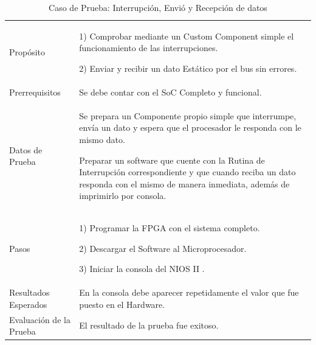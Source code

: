 \begin{table}
	\begin{tabular}{|>{\columncolor[gray]{0.8}}l|p{9cm}|} \hline
\multicolumn{2}{|>{\columncolor[gray]{0.8}}l|}{\textbf{Caso de Prueba: Interrupción, Envió y Recepción de datos}}\\ \hline
Propósito  & 1) Comprobar mediante un Custom Component simple el funcionamiento de las interrupciones.

2) Enviar y recibir un dato Estático por el bus sin errores. 
\\ \hline
 Prerrequisitos  & Se debe contar con el SoC Completo y funcional.\\ \hline
 Datos de Prueba & Se prepara un Componente propio simple que interrumpe, envía un dato y espera que el procesador le responda con le mismo dato. 

Preparar un software que cuente con la Rutina de Interrupción correspondiente y que cuando reciba un dato responda con el mismo de manera inmediata, además de imprimirlo por consola.
 \\ \hline
 Pasos & 1) Programar la FPGA con el sistema completo.

2) Descargar el Software al Microprocesador.

3) Iniciar la consola del NIOS II .
\\ \hline
 Resultados Esperados & En la consola debe aparecer repetidamente el valor que fue puesto en el Hardware. \\ \hline
 Evaluación de la Prueba  & El resultado de la prueba fue exitoso.\\ \hline
	\end{tabular}
	\caption{Caso de Prueba: Interrupción, Envió y Recepción de datos}
	\label{tab:enviorecepcion}
\end{table}
